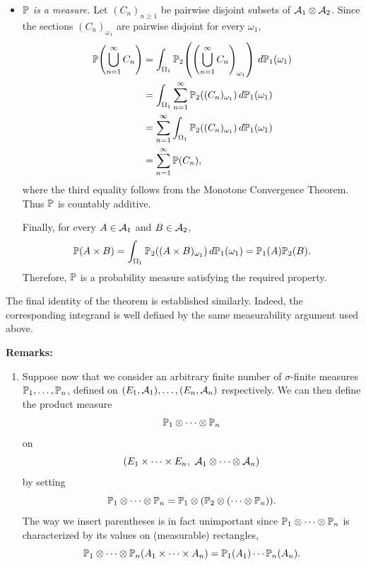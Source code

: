 \documentclass[../Main.tex]{subfiles}
\begin{document}
{\begin{enumerate}
\begin{itemize}
        \item \textit{$\mathbb{P}$ is a measure.}
        Let $(C_n)_{n\ge 1}$ be pairwise disjoint subsets of $\mathcal{A}_1\otimes\mathcal{A}_2$. Since the sections $(C_n)_{\omega_1}$ are pairwise disjoint for every $\omega_1$,
        $$
        \begin{aligned}
        \mathbb{P}\!\left(\bigcup_{n=1}^\infty C_n\right)
        &=\int_{\Omega_1}\mathbb{P}_2\!\left(\left(\bigcup_{n=1}^\infty C_n\right)_{\omega_1}\right)\,d\mathbb{P}_1(\omega_1)\\
        &=\int_{\Omega_1}\sum_{n=1}^\infty\mathbb{P}_2((C_n)_{\omega_1})\,d\mathbb{P}_1(\omega_1)\\
        &=\sum_{n=1}^\infty\int_{\Omega_1}\mathbb{P}_2((C_n)_{\omega_1})\,d\mathbb{P}_1(\omega_1)\\
        &=\sum_{n=1}^\infty\mathbb{P}(C_n),
        \end{aligned}
        $$
        where the third equality follows from the Monotone Convergence Theorem. Thus $\mathbb{P}$ is countably additive.

        Finally, for every $A\in\mathcal{A}_1$ and $B\in\mathcal{A}_2$,
        $$
        \mathbb{P}(A\times B)
        =\int_{\Omega_1}\mathbb{P}_2((A\times B)_{\omega_1})\,d\mathbb{P}_1(\omega_1)
        =\mathbb{P}_1(A)\mathbb{P}_2(B).
        $$
        Therefore, $\mathbb{P}$ is a probability measure satisfying the required property.
    \end{itemize}
\end{enumerate}

The final identity of the theorem is established similarly. Indeed, the corresponding integrand is well defined by the same measurability argument used above.    
}


\textbf{Remarks:} 
\begin{enumerate}
\item Suppose now that we consider an arbitrary finite number of $\sigma$-finite measures $\mathbb{P}_1,\ldots,\mathbb{P}_n$, defined on $(E_1,\mathcal{A}_1),\ldots,(E_n,\mathcal{A}_n)$ respectively. We can then define the product measure
\[ \mathbb{P}_1 \otimes \cdots \otimes \mathbb{P}_n \]
on
\[ (E_1 \times \cdots \times E_n,\ \mathcal{A}_1 \otimes \cdots \otimes \mathcal{A}_n) \]
by setting
\[ \mathbb{P}_1 \otimes \cdots \otimes \mathbb{P}_n = \mathbb{P}_1 \otimes (\mathbb{P}_2 \otimes (\cdots \otimes \mathbb{P}_n)). \]
The way we insert parentheses is in fact unimportant since $\mathbb{P}_1 \otimes \cdots \otimes \mathbb{P}_n$ is characterized by its values on (measurable) rectangles,
\[ \mathbb{P}_1 \otimes \cdots \otimes \mathbb{P}_n(A_1 \times \cdots \times A_n) = \mathbb{P}_1(A_1)\cdots\mathbb{P}_n(A_n). \]
\end{enumerate}
\end{document}
